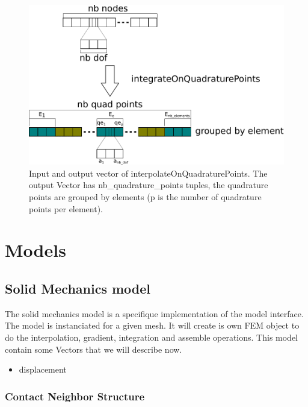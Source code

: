 \documentclass[a4paper,11pt]{book}
\begin{document}
\begin{figure}[!htb]
  \centering
  \includegraphics{figures/interpolate}
  \caption{Input and output  vector of interpolateOnQuadraturePoints. The output
    Vector has nb\_quadrature\_points tuples, the quadrature points are grouped by
    elements (p is the number of quadrature points per element).}
  \label{fig:interpolate-storage}
\end{figure}

\chapter{Models}

\section{Solid Mechanics model}

The  solid  mechanics  model  is   a  specifique  implementation  of  the  model
interface. The model is instanciated for a given mesh. It will create is own FEM
object   to   do  the   interpolation,   gradient,   integration  and   assemble
operations. This model contain some Vectors that we will describe now.

\begin{itemize}
\item displacement
\end{itemize}


\subsection{Contact Neighbor Structure}
\end{document}
